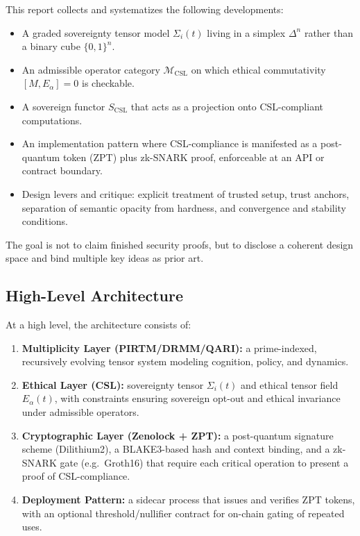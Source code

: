 \documentclass[11pt]{article}
\begin{document}
This report collects and systematizes the following developments:

\begin{itemize}[leftmargin=*]
  \item A graded sovereignty tensor model $\Sigma_i(t)$ living in a simplex $\Delta^n$ rather than a binary cube $\{0,1\}^n$.
  \item An admissible operator category $\mathcal{M}_{\mathrm{CSL}}$ on which ethical commutativity $[M,E_\alpha]=0$ is checkable.
  \item A sovereign functor $S_{\mathrm{CSL}}$ that acts as a projection onto CSL-compliant computations.
  \item An implementation pattern where CSL-compliance is manifested as a post-quantum token (ZPT) plus zk-SNARK proof,
        enforceable at an API or contract boundary.
  \item Design levers and critique: explicit treatment of trusted setup, trust anchors, separation of semantic opacity from hardness, and convergence and stability conditions.
\end{itemize}

The goal is not to claim finished security proofs, but to disclose a coherent design space and bind multiple key ideas as prior art.

\subsection{High-Level Architecture}

At a high level, the architecture consists of:

\begin{enumerate}[leftmargin=*]
  \item \textbf{Multiplicity Layer (PIRTM/DRMM/QARI):}
        a prime-indexed, recursively evolving tensor system modeling cognition, policy, and dynamics.
  \item \textbf{Ethical Layer (CSL):}
        sovereignty tensor $\Sigma_i(t)$ and ethical tensor field $E_\alpha(t)$, with constraints
        ensuring sovereign opt-out and ethical invariance under admissible operators.
  \item \textbf{Cryptographic Layer (Zenolock + ZPT):}
        a post-quantum signature scheme (Dilithium2), a BLAKE3-based hash and context binding, and a zk-SNARK gate
        (e.g.~Groth16) that require each critical operation to present a proof of CSL-compliance.
  \item \textbf{Deployment Pattern:}
        a sidecar process that issues and verifies ZPT tokens, with an optional threshold/nullifier contract
        for on-chain gating of repeated uses.
\end{enumerate}
\end{document}
